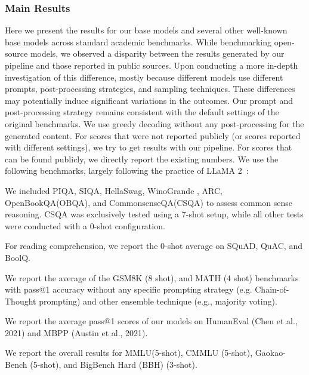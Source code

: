 \subsubsection{Main Results}
\label{sec:main results}

Here we present the results for our base models and several other well-known base models across standard academic benchmarks. While benchmarking open-source models, we observed a disparity between the results generated by our pipeline and those reported in public sources. Upon conducting a more in-depth investigation of this difference, mostly because different models use different prompts, post-processing strategies, and sampling techniques.
These differences may potentially induce significant variations in the outcomes. Our prompt and post-processing strategy remains consistent with the default settings of the original benchmarks\citep{PIQA,siqa,hellaswag,winogrande,arc,obqa,csqa,squad,quac,boolq,cobbe2021training,hendrycks2021measuring,chen2021evaluating,austin2021program,hendrycks2020measuring,li2023cmmlu,zhang2023evaluating,srivastava2023imitation,suzgun2022challenging}.
We use greedy decoding without any post-processing for the generated content. For scores that were not reported publicly (or scores reported with different settings), we try to get results with our pipeline. For scores that can be found publicly, we directly report the existing numbers. We use the following benchmarks, largely following the practice of LLaMA 2~\citep{llama2}:

\begin{description}[leftmargin=0.2in]
    \item[Commonsense Reasoning:] We included PIQA\cite{PIQA}, SIQA\cite{siqa}, HellaSwag\cite{hellaswag}, WinoGrande \cite{winogrande}, ARC\cite{arc}, OpenBookQA(OBQA)\cite{obqa}, and CommonsenseQA(CSQA)\cite{csqa} to assess common sense reasoning. CSQA was exclusively tested using a 7-shot setup, while all other tests were conducted with a 0-shot configuration.
    \item[Reading Comprehension:] For reading comprehension, we report the 0-shot average on SQuAD\cite{squad}, QuAC\cite{quac}, and BoolQ\cite{boolq}.
    \item[Math:] We report the average of the GSM8K\cite{cobbe2021training} (8 shot), and MATH\cite{hendrycks2021measuring} (4 shot) benchmarks with pass@1 accuracy without any specific prompting strategy (e.g. Chain-of-Thought prompting) and other ensemble technique (e.g., majority voting).
    \item[Code:] We report the average pass@1 scores of our models on HumanEval\cite{chen2021evaluating}  (Chen et al., 2021) and MBPP\cite{austin2021program} (Austin et al., 2021). 
    \item[Popular Aggregated Benchmark:] We report the overall results for MMLU\cite{hendrycks2020measuring}(5-shot), CMMLU\cite{li2023cmmlu} (5-shot), Gaokao-Bench\cite{zhang2023evaluating} (5-shot), and BigBench\cite{srivastava2023imitation} Hard (BBH\cite{suzgun2022challenging}) (3-shot).
\end{description}


